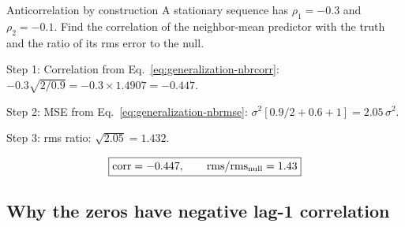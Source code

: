 \begin{sample}{Anticorrelation by construction}
A stationary sequence has $\rho_1=-0.3$ and $\rho_2=-0.1$. Find the correlation of the neighbor-mean predictor with the truth and the ratio of its rms error to the null.

Step 1: Correlation from Eq.~\eqref{eq:generalization-nbrcorr}: $-0.3\sqrt{2/0.9}=-0.3\times1.4907=-0.447$.

Step 2: MSE from Eq.~\eqref{eq:generalization-nbrmse}: $\sigma^2[0.9/2+0.6+1]=2.05\,\sigma^2$.

Step 3: rms ratio: $\sqrt{2.05}=1.432$.

\[
\boxed{\mathrm{corr}=-0.447,\qquad \mathrm{rms}/\mathrm{rms}_{\rm null}=1.43}
\]
\end{sample}

\subsection{Why the zeros have negative lag-1 correlation}

